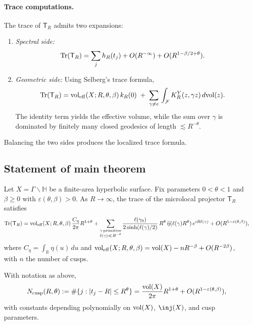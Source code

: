 \paragraph{Trace computations.}  
The trace of $\mathsf{T}_R$ admits two expansions:
\begin{enumerate}
  \item \emph{Spectral side:} 
    \[
      \mathrm{Tr}(\mathsf{T}_R) = \sum_j h_R(t_j) + O(R^{-\infty}) + O(R^{1-\beta/2+\theta}).
    \]
  \item \emph{Geometric side:} Using Selberg’s trace formula,
    \[
      \mathrm{Tr}(\mathsf{T}_R) = \operatorname{vol}_{\mathrm{eff}}(X;R,\theta,\beta)\,k_R(0) \;+\;
        \sum_{\gamma\neq e}\, \int_{\mathcal{F}} K_R^Y(z,\gamma z)\,d\mathrm{vol}(z).
    \]
    The identity term yields the effective volume, while the sum over $\gamma$ is 
    dominated by finitely many closed geodesics of length $\lesssim R^{-\theta}$.
\end{enumerate}

Balancing the two sides produces the localized trace formula.

\subsection{Statement of main theorem}\label{subsec:mainthm}

\begin{theorem}
Let $X = \Gamma\backslash \mathbb{H}$ be a finite-area hyperbolic surface. Fix parameters 
$0<\theta<1$ and $\beta \geq 0$ with $\varepsilon(\theta,\beta)>0$. As $R\to\infty$, the 
trace of the microlocal projector $\mathsf{T}_R$ satisfies
\[
  \mathrm{Tr}(\mathsf{T}_R) = \operatorname{vol}_{\mathrm{eff}}(X;R,\theta,\beta)\,\frac{C_\eta}{2\pi} R^{1+\theta}
    + \sum_{\substack{\gamma \,\text{primitive}\\ \ell(\gamma)\ll R^{-\theta}}}
      \frac{\ell(\gamma_0)}{2\sinh(\ell(\gamma)/2)}\,R^\theta\,
      \widehat{\eta}(\ell(\gamma)R^\theta)\, e^{iR\ell(\gamma)}
    + O(R^{1-\varepsilon(\theta,\beta)}),
\]
where $C_\eta = \int_\mathbb{R}\eta(u)\,du$ and 
$\operatorname{vol}_{\mathrm{eff}}(X;R,\theta,\beta) = \operatorname{vol}(X) - n R^{-\beta} + O(R^{-2\beta})$, with $n$ 
the number of cusps.
\end{theorem}

\begin{corollary}
With notation as above,
\[
  N_{\mathrm{cusp}}(R,\theta) := \#\{j : |t_j-R|\leq R^\theta\}
  = \frac{\operatorname{vol}(X)}{2\pi} R^{1+\theta} + O(R^{1-\varepsilon(\theta,\beta)}),
\]
with constants depending polynomially on $\operatorname{vol}(X)$, $\inj(X)$, and cusp parameters.
\end{corollary}

